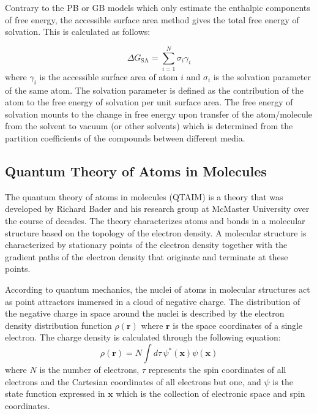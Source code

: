 \documentclass[11pt]{report}
\begin{document}
Contrary to the PB or GB models which only estimate the
enthalpic components of free energy, the accessible surface
area method gives the total free energy of solvation.
This is calculated as follows:

\begin{equation}
\Delta G_\text{SA} = \sum_{i=1}^{N} \sigma_i{\gamma_i}
\end{equation}
where $\gamma_i$ is the accessible surface area of atom $i$
and $\sigma_i$ is the solvation parameter of the same atom.
The solvation parameter is defined as the contribution 
of the atom to the free energy of solvation per unit surface area.
The free energy of solvation mounts to the change in free
energy upon transfer of the atom/molecule from the solvent
to vacuum (or other solvents) which is determined from the partition
coefficients of the compounds between different media. 

\subsection{Quantum Theory of Atoms in Molecules}

The quantum theory of atoms in molecules (QTAIM) is a theory that was
developed by Richard Bader and his research group at
McMaster University over the course of decades.
The theory characterizes atoms and bonds in a molecular 
structure based on the topology of the electron density.
A molecular structure is characterized by stationary points of the
electron density together with the gradient paths of the 
electron density that originate and terminate at these points.

According to quantum mechanics, the nuclei of atoms in molecular
structures act as point attractors immersed in a cloud of negative charge.
The distribution of the negative charge in space around the nuclei
is described by the electron density distribution function $\rho(\mathbf{r})$
where $\mathbf{r}$ is the space coordinates of a single electron. The
charge density is calculated through the following equation:
\begin{equation}
\rho (\mathbf{r}) = N \int d\tau\,\psi^*(\mathbf{x})\psi(\mathbf{x})
\end{equation} 
where $N$ is the number of electrons, $\tau$ represents the spin coordinates
of all electrons and the Cartesian coordinates of all electrons but one, and
$\psi$ is the state function expressed in $\mathbf{x}$ which is the 
collection of electronic space and spin coordinates. 
\end{document}
